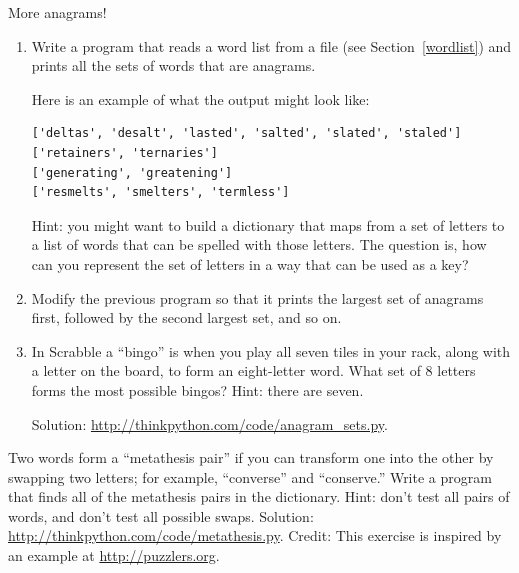 \documentclass[10pt]{book}
\begin{document}
\begin{exercise}
\label{anagrams}

More anagrams!

\begin{enumerate}

\item Write a program
that reads a word list from a file (see Section~\ref{wordlist}) and
prints all the sets of words that are anagrams.

Here is an example of what the output might look like:

\begin{verbatim}
['deltas', 'desalt', 'lasted', 'salted', 'slated', 'staled']
['retainers', 'ternaries']
['generating', 'greatening']
['resmelts', 'smelters', 'termless']
\end{verbatim}
%
Hint: you might want to build a dictionary that maps from a
set of letters to a list of words that can be spelled with those
letters.  The question is, how can you represent the set of
letters in a way that can be used as a key?

\item Modify the previous program so that it prints the largest set
of anagrams first, followed by the second largest set, and so on.

\item In Scrabble a ``bingo'' is when you play all seven tiles in
your rack, along with a letter on the board, to form an eight-letter
word.  What set of 8 letters forms the most possible bingos?
Hint: there are seven.


Solution: \url{http://thinkpython.com/code/anagram_sets.py}.

\end{enumerate}
\end{exercise}

\begin{exercise}

Two words form a ``metathesis pair'' if you can transform one into the
other by swapping two letters; for example, ``converse'' and
``conserve.''  Write a program that finds all of the metathesis pairs
in the dictionary.  Hint: don't test all pairs of words, and don't
test all possible swaps.  Solution: \url{http://thinkpython.com/code/metathesis.py}.
Credit: This exercise is inspired by an example at \url{http://puzzlers.org}.

\end{exercise}
\end{document}
